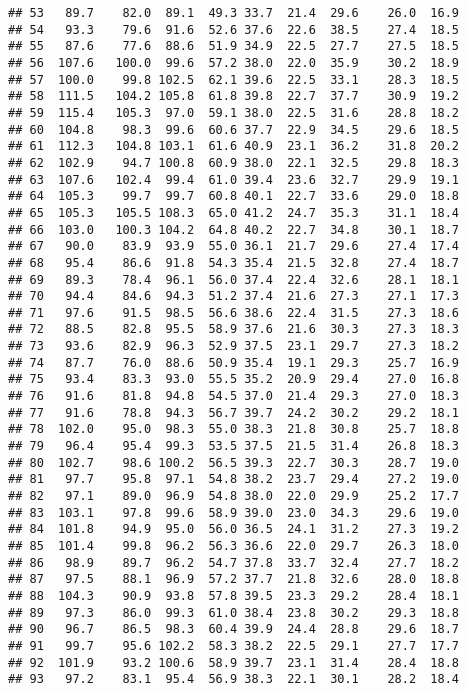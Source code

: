 \documentclass[
]{book}
\theoremstyle{definition}
\theoremstyle{definition}
\theoremstyle{definition}
\theoremstyle{definition}
\theoremstyle{remark}
\begin{document}
\begin{verbatim}
## 53   89.7    82.0  89.1  49.3 33.7  21.4  29.6    26.0  16.9
## 54   93.3    79.6  91.6  52.6 37.6  22.6  38.5    27.4  18.5
## 55   87.6    77.6  88.6  51.9 34.9  22.5  27.7    27.5  18.5
## 56  107.6   100.0  99.6  57.2 38.0  22.0  35.9    30.2  18.9
## 57  100.0    99.8 102.5  62.1 39.6  22.5  33.1    28.3  18.5
## 58  111.5   104.2 105.8  61.8 39.8  22.7  37.7    30.9  19.2
## 59  115.4   105.3  97.0  59.1 38.0  22.5  31.6    28.8  18.2
## 60  104.8    98.3  99.6  60.6 37.7  22.9  34.5    29.6  18.5
## 61  112.3   104.8 103.1  61.6 40.9  23.1  36.2    31.8  20.2
## 62  102.9    94.7 100.8  60.9 38.0  22.1  32.5    29.8  18.3
## 63  107.6   102.4  99.4  61.0 39.4  23.6  32.7    29.9  19.1
## 64  105.3    99.7  99.7  60.8 40.1  22.7  33.6    29.0  18.8
## 65  105.3   105.5 108.3  65.0 41.2  24.7  35.3    31.1  18.4
## 66  103.0   100.3 104.2  64.8 40.2  22.7  34.8    30.1  18.7
## 67   90.0    83.9  93.9  55.0 36.1  21.7  29.6    27.4  17.4
## 68   95.4    86.6  91.8  54.3 35.4  21.5  32.8    27.4  18.7
## 69   89.3    78.4  96.1  56.0 37.4  22.4  32.6    28.1  18.1
## 70   94.4    84.6  94.3  51.2 37.4  21.6  27.3    27.1  17.3
## 71   97.6    91.5  98.5  56.6 38.6  22.4  31.5    27.3  18.6
## 72   88.5    82.8  95.5  58.9 37.6  21.6  30.3    27.3  18.3
## 73   93.6    82.9  96.3  52.9 37.5  23.1  29.7    27.3  18.2
## 74   87.7    76.0  88.6  50.9 35.4  19.1  29.3    25.7  16.9
## 75   93.4    83.3  93.0  55.5 35.2  20.9  29.4    27.0  16.8
## 76   91.6    81.8  94.8  54.5 37.0  21.4  29.3    27.0  18.3
## 77   91.6    78.8  94.3  56.7 39.7  24.2  30.2    29.2  18.1
## 78  102.0    95.0  98.3  55.0 38.3  21.8  30.8    25.7  18.8
## 79   96.4    95.4  99.3  53.5 37.5  21.5  31.4    26.8  18.3
## 80  102.7    98.6 100.2  56.5 39.3  22.7  30.3    28.7  19.0
## 81   97.7    95.8  97.1  54.8 38.2  23.7  29.4    27.2  19.0
## 82   97.1    89.0  96.9  54.8 38.0  22.0  29.9    25.2  17.7
## 83  103.1    97.8  99.6  58.9 39.0  23.0  34.3    29.6  19.0
## 84  101.8    94.9  95.0  56.0 36.5  24.1  31.2    27.3  19.2
## 85  101.4    99.8  96.2  56.3 36.6  22.0  29.7    26.3  18.0
## 86   98.9    89.7  96.2  54.7 37.8  33.7  32.4    27.7  18.2
## 87   97.5    88.1  96.9  57.2 37.7  21.8  32.6    28.0  18.8
## 88  104.3    90.9  93.8  57.8 39.5  23.3  29.2    28.4  18.1
## 89   97.3    86.0  99.3  61.0 38.4  23.8  30.2    29.3  18.8
## 90   96.7    86.5  98.3  60.4 39.9  24.4  28.8    29.6  18.7
## 91   99.7    95.6 102.2  58.3 38.2  22.5  29.1    27.7  17.7
## 92  101.9    93.2 100.6  58.9 39.7  23.1  31.4    28.4  18.8
## 93   97.2    83.1  95.4  56.9 38.3  22.1  30.1    28.2  18.4

\end{verbatim}
\end{document}
